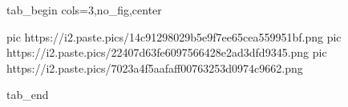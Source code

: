 
 
 
 
 


\ifcmt
  tab_begin cols=3,no_fig,center

     pic https://i2.paste.pics/14c91298029b5e9f7ee65cea559951bf.png
		 pic https://i2.paste.pics/22407d63fe6097566428e2ad3dfd9345.png
		 pic https://i2.paste.pics/7023a4f5aafaff00763253d0974c9662.png

  tab_end
\fi
